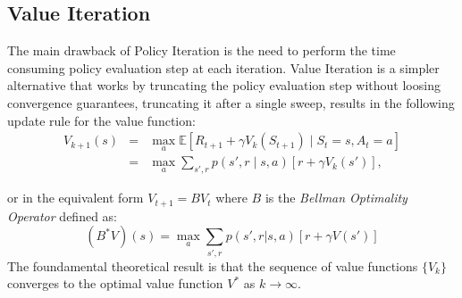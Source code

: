 
\subsection{Value Iteration}
The main drawback of Policy Iteration is the need to perform the time consuming policy 
evaluation step at each iteration.
Value Iteration is a simpler alternative that works by truncating the policy evaluation step 
without loosing convergence guarantees, truncating it after a single sweep, results in the following update rule for the 
value function:
\[
\begin{array}{lll}
V_{k+1}(s) & = & \displaystyle \max_{a} \mathbb{E}[R_{t+1}+\gamma V_k(S_{t+1}) \mid S_t=s, A_t=a] \\ 
& = & \displaystyle \max_{a} \sum\limits_{s',r} p(s',r \mid s, a) \left[r+\gamma V_k(s')\right],
\end{array}
\]

or in the equivalent form $V_{t+1} = BV_t$
where $B$ is the \emph{Bellman Optimality Operator} defined as: 
\begin{equation}
    (B^*V)(s) = \max_{a} \sum_{s',r} p(s',r|s,a) \left[ r + \gamma V(s') \right]
    \label{eq:bellman-operator}
\end{equation}
The foundamental theoretical result is that the sequence of value functions $\{V_k\}$ converges to the optimal
value function $V^*$ as $k \rightarrow \infty$.

